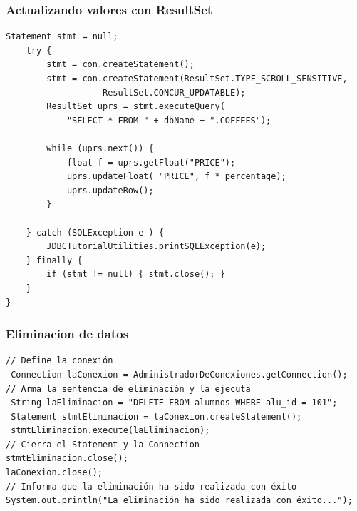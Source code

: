 \documentclass{beamer}
\begin{document}
\begin{frame}[fragile]
\frametitle{Actualizando valores con ResultSet}
\begin{footnotesize}
\begin{verbatim}
Statement stmt = null;
    try {
        stmt = con.createStatement();
        stmt = con.createStatement(ResultSet.TYPE_SCROLL_SENSITIVE,
                   ResultSet.CONCUR_UPDATABLE);
        ResultSet uprs = stmt.executeQuery(
            "SELECT * FROM " + dbName + ".COFFEES");

        while (uprs.next()) {
            float f = uprs.getFloat("PRICE");
            uprs.updateFloat( "PRICE", f * percentage);
            uprs.updateRow();
        }

    } catch (SQLException e ) {
        JDBCTutorialUtilities.printSQLException(e);
    } finally {
        if (stmt != null) { stmt.close(); }
    }
}
\end{verbatim}
\end{footnotesize}
\end{frame}


\begin{frame}[fragile]
\frametitle{Eliminacion de datos}
\begin{footnotesize}
\begin{verbatim}
// Define la conexión
 Connection laConexion = AdministradorDeConexiones.getConnection();       
// Arma la sentencia de eliminación y la ejecuta
 String laEliminacion = "DELETE FROM alumnos WHERE alu_id = 101";
 Statement stmtEliminacion = laConexion.createStatement();
 stmtEliminacion.execute(laEliminacion);       
// Cierra el Statement y la Connection
stmtEliminacion.close();
laConexion.close();       
// Informa que la eliminación ha sido realizada con éxito
System.out.println("La eliminación ha sido realizada con éxito...");
\end{verbatim}
\end{footnotesize}
\end{frame}
\end{document}
